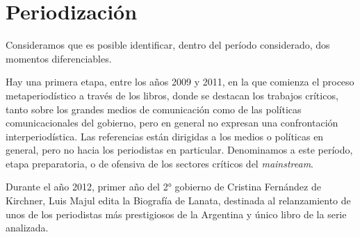 
\section {Periodización}

Consideramos que es posible identificar, dentro del período considerado, dos momentos diferenciables.

Hay una primera etapa, entre los años 2009 y 2011, en la que comienza el proceso metaperiodístico a través de los libros, donde se destacan los trabajos críticos, tanto sobre los grandes medios de comunicación como de las políticas comunicacionales del gobierno, pero en general no expresan una confrontación interperiodística. Las referencias están dirigidas a los medios o políticas en general, pero no hacia los periodistas en particular. Denominamos a este período, etapa preparatoria, o de ofensiva de los sectores críticos del \emph{mainstream}.

Durante el año 2012, primer año del 2° gobierno de Cristina Fernández de Kirchner, Luis Majul edita la Biografía de Lanata, destinada al relanzamiento de unos de los periodistas más prestigiosos de la Argentina y único libro de la serie analizada.

